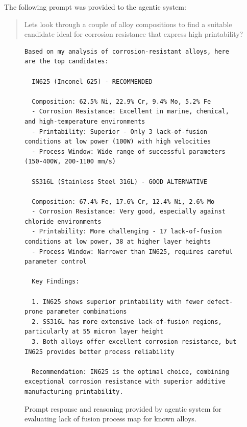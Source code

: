 The following prompt was provided to the agentic system:

\begin{quote}
Lets look through a couple of alloy compositions to find a suitable candidate ideal for corrosion resistance that express high printability?
\end{quote}


\begin{figure}[htbp]
\centering
\begin{minipage}{\linewidth}
\begin{lstlisting}[style=mypython]
Based on my analysis of corrosion-resistant alloys, here are the top candidates:

  IN625 (Inconel 625) - RECOMMENDED

  Composition: 62.5% Ni, 22.9% Cr, 9.4% Mo, 5.2% Fe
  - Corrosion Resistance: Excellent in marine, chemical, and high-temperature environments
  - Printability: Superior - Only 3 lack-of-fusion conditions at low power (100W) with high velocities
  - Process Window: Wide range of successful parameters (150-400W, 200-1100 mm/s)

  SS316L (Stainless Steel 316L) - GOOD ALTERNATIVE

  Composition: 67.4% Fe, 17.6% Cr, 12.4% Ni, 2.6% Mo
  - Corrosion Resistance: Very good, especially against chloride environments
  - Printability: More challenging - 17 lack-of-fusion conditions at low power, 38 at higher layer heights
  - Process Window: Narrower than IN625, requires careful parameter control

  Key Findings:

  1. IN625 shows superior printability with fewer defect-prone parameter combinations
  2. SS316L has more extensive lack-of-fusion regions, particularly at 55 micron layer height
  3. Both alloys offer excellent corrosion resistance, but IN625 provides better process reliability

  Recommendation: IN625 is the optimal choice, combining exceptional corrosion resistance with superior additive manufacturing printability.
\end{lstlisting}
\caption{Prompt response and reasoning provided by agentic system for evaluating lack of fusion process map for known alloys.}
\label{fig:llm_prompt_response}
\end{minipage}
\end{figure}
